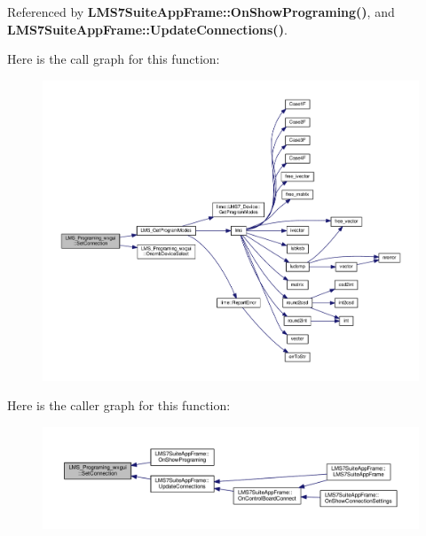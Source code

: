 Referenced by {\bf L\+M\+S7\+Suite\+App\+Frame\+::\+On\+Show\+Programing()}, and {\bf L\+M\+S7\+Suite\+App\+Frame\+::\+Update\+Connections()}.



Here is the call graph for this function\+:
\nopagebreak
\begin{figure}[H]
\begin{center}
\leavevmode
\includegraphics[width=350pt]{db/d33/classLMS__Programing__wxgui_ab57b7eef0ed213db50d9d122e0d74227_cgraph}
\end{center}
\end{figure}




Here is the caller graph for this function\+:
\nopagebreak
\begin{figure}[H]
\begin{center}
\leavevmode
\includegraphics[width=350pt]{db/d33/classLMS__Programing__wxgui_ab57b7eef0ed213db50d9d122e0d74227_icgraph}
\end{center}
\end{figure}


